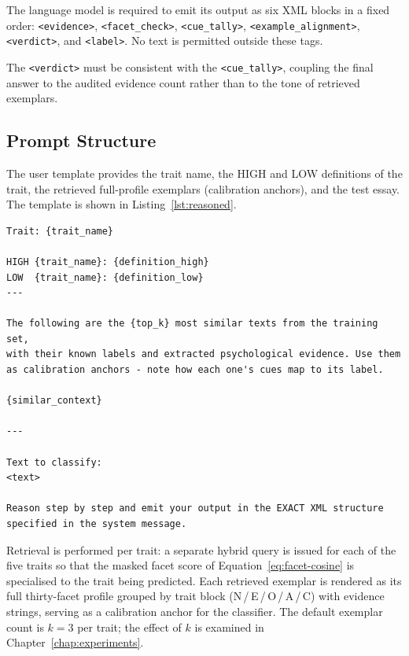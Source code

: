 \documentclass[../main.tex]{subfiles}
\begin{document}
The language model is required to emit its output as six XML blocks in a fixed
order: \texttt{<evidence>}, \texttt{<facet\_check>}, \texttt{<cue\_tally>},
\texttt{<example\_alignment>}, \texttt{<verdict>}, and \texttt{<label>}. No
text is permitted outside these tags.

The \texttt{<verdict>} must be consistent with the \texttt{<cue\_tally>},
coupling the final answer to the audited evidence count rather than to the
tone of retrieved exemplars.

\subsection{Prompt Structure}

The user template provides the trait name, the HIGH and LOW definitions of the
trait, the retrieved full-profile exemplars (calibration anchors), and the test
essay. The template is shown in Listing~\ref{lst:reasoned}.

\begin{lstlisting}[style=promptbox,
  caption={Reasoned RAG user template.},
  label={lst:reasoned}]
Trait: {trait_name}

HIGH {trait_name}: {definition_high}
LOW  {trait_name}: {definition_low}
---

The following are the {top_k} most similar texts from the training set,
with their known labels and extracted psychological evidence. Use them
as calibration anchors - note how each one's cues map to its label.

{similar_context}

---

Text to classify:
<text>

Reason step by step and emit your output in the EXACT XML structure
specified in the system message.
\end{lstlisting}

Retrieval is performed per trait: a separate hybrid query is issued for each
of the five traits so that the masked facet score of
Equation~\eqref{eq:facet-cosine} is specialised to the trait being predicted.
Each retrieved exemplar is rendered as its full thirty-facet profile grouped by
trait block (N\,/\,E\,/\,O\,/\,A\,/\,C) with evidence strings, serving as a
calibration anchor for the classifier.
The default exemplar count is $k = 3$ per trait; the effect of $k$ is examined
in Chapter~\ref{chap:experiments}.
\end{document}

